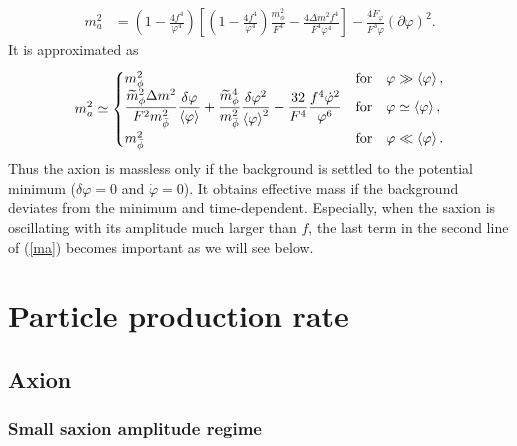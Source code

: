 \documentclass[12pt, a4paper]{article}
\begin{document}
\begin{align}
	m_{a}^2
	&= \left(1-\frac{4f^4}{\varphi^4}\right)\left[\left(1-\frac{4f^4}{\varphi^4}\right) \frac{m_\phi^2}{F^4} 
	- \frac{4\Delta m^2 f^4}{F^4\varphi^4}\right]
	- \frac{4F_\varphi}{F^3 \varphi}(\partial\varphi)^2. 
	\label{ma2}
\end{align}
It is approximated as
\begin{align}
	m_{a}^2 \simeq\begin{cases}
		m_\phi^2 & {\rm for} ~~~\varphi \gg \left<\varphi\right>,\\
		\displaystyle \frac{\widetilde m_\phi^2 \Delta m^2}{F^2 m_{\bar\phi}^2}\frac{\delta\varphi}{ \left<\varphi\right>} 
		+\frac{\widetilde m_\phi^4}{m_{\bar\phi}^2}\frac{\delta\varphi^2}{\left<\varphi\right>^2} - \frac{32}{F^4}\frac{f^4\dot\varphi^2}{\varphi^6}
		& {\rm for} ~~~\varphi \simeq \left<\varphi\right>,\\
		m_{\bar\phi}^2 & {\rm for} ~~~\varphi \ll \left<\varphi\right>. 
	\end{cases}
	\label{ma}
\end{align}
Thus the axion is massless only if the background is settled to the potential minimum ($\delta\varphi=0$ and $\dot\varphi=0$).
It obtains effective mass if the background deviates from the minimum and time-dependent.
Especially, when the saxion is oscillating with its amplitude much larger than $f$, 
the last term in the second line of (\ref{ma}) becomes important as we will see below.


\section{Particle production rate}  \label{sec:prod}


\subsection{Axion}  \label{sec:axion}


\subsubsection{Small saxion amplitude regime}
\end{document}
